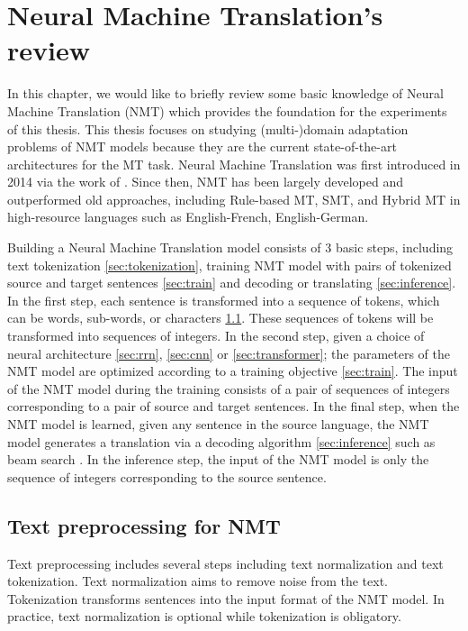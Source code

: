 \chapter{Neural Machine Translation’s review}
In this chapter, we would like to briefly review some basic knowledge of Neural Machine Translation (NMT) which provides the foundation for the experiments of this thesis. This thesis focuses on studying (multi-)domain adaptation problems of NMT models because they are the current state-of-the-art architectures for the MT task. Neural Machine Translation was first introduced in 2014 via the work of \cite{Bahdanau15learning,Cho14properties}. Since then, NMT has been largely developed and outperformed old approaches, including Rule-based MT, SMT, and Hybrid MT in high-resource languages such as English-French, English-German.

Building a Neural Machine Translation model consists of 3 basic steps, including text tokenization \ref{sec:tokenization}, training NMT model with pairs of tokenized source and target sentences \ref{sec:train} and decoding or translating \ref{sec:inference}. In the first step, each sentence is transformed into a sequence of tokens, which can be words, sub-words, or characters \ref{sec:preprocessing}. These sequences of tokens will be transformed into sequences of integers. In the second step, given a choice of neural architecture \ref{sec:rrn}, \ref{sec:cnn} or \ref{sec:transformer}; the parameters of the NMT model are optimized according to a training objective \ref{sec:train}. The input of the NMT model during the training consists of a pair of sequences of integers corresponding to a pair of source and target sentences. In the final step, when the NMT model is learned, given any sentence in the source language, the NMT model generates a translation via a decoding algorithm \ref{sec:inference} such as beam search \citep{Koehn04pharaoh}. In the inference step, the input of the NMT model is only the sequence of integers corresponding to the source sentence.

\section{Text preprocessing for NMT \label{sec:tokenization}} \label{sec:preprocessing}
Text preprocessing includes several steps including text normalization and text tokenization. Text normalization aims to remove noise from the text. Tokenization transforms sentences into the input format of the NMT model. In practice, text normalization is optional while tokenization is obligatory.

